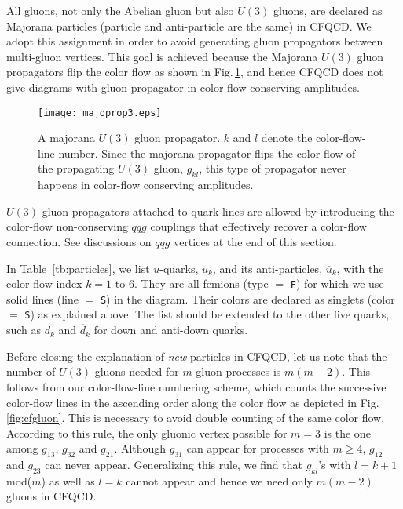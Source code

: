 \documentclass[a4paper,11pt]{article}
\begin{document}
All gluons, not only the Abelian gluon but also $U(3)$ gluons, are declared as Majorana particles (particle and anti-particle are the same)
in CFQCD. We adopt this assignment in order to avoid generating
gluon propagators between multi-gluon vertices. This goal is achieved because the
Majorana $U(3)$ gluon propagators flip the color flow as shown in Fig.\,\ref{fig:majoprop}, and hence
CFQCD does not give diagrams with gluon propagator in color-flow
conserving amplitudes.
\begin{figure}
\begin{center}
\texttt{[image: majoprop3.eps]}
\caption{A majorana $U(3)$ gluon propagator. $k$ and $l$ denote the
 color-flow-line number. Since the majorana propagator
 flips the color flow of the propagating $U(3)$ gluon, $g_{kl}$, this type of
 propagator never happens in color-flow conserving amplitudes. }
\label{fig:majoprop}
\end{center}
\end{figure}
$U(3)$ gluon propagators attached to quark lines
are allowed by introducing the color-flow non-conserving $qqg$ couplings
that effectively recover a color-flow connection. See discussions on $qqg$
vertices at the end of this section.

In Table~\ref{tb:particles}, we list $u$-quarks, $u_k$, and its
anti-particles, $\overline{u}_k$, with the color-flow index $k=1$
to $6$. They are all femions (type $=$ {\tt F}) for which we use solid
lines (line $=$ {\tt S}) in the diagram. Their colors are declared as
singlets (color $=$ {\tt S}) as explained above. The list should be
extended to the other five quarks, such as $d_k$ and $\overline{d}_k$ for down and anti-down quarks.

Before closing the explanation of {\it new} particles in CFQCD, let us note
 that the number of $U(3)$ gluons needed for $m$-gluon processes is $m(m-2)$. This follows from
our color-flow-line numbering scheme, which counts the successive
color-flow lines in the
ascending order along the color flow as depicted in
Fig.\,\ref{fig:cfgluon}. This is necessary to avoid
double counting of the same color flow. According to this rule, the only
gluonic vertex possible for $m=3$ is the one among $g_{13}$, $g_{32}$ and
$g_{21}$. Although $g_{31}$ can appear
 for processes
 with $m\geq4$, $g_{12}$ and $g_{23}$ can
never appear. Generalizing this rule, we find that $g_{kl}$'s with $l=k+1$ mod($m$) as well as $l=k$ cannot appear and hence we need only $m(m-2)$ gluons in CFQCD.
\end{document}
